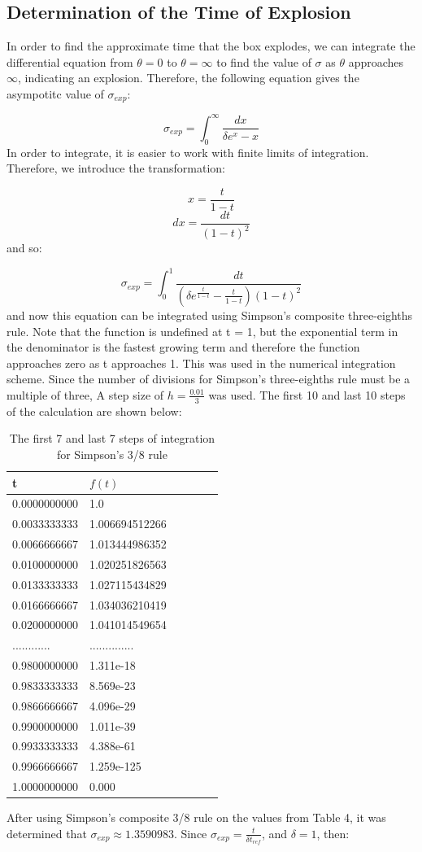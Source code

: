 \documentclass[12pt]{article}\pagestyle{myheadings}
\theoremstyle{plain}
\begin{document}
\subsection{Determination of the Time of Explosion}

In order to find the approximate time that the box explodes, we can integrate the differential equation from $\theta = 0$ to $\theta = \infty$ to find the value of $\sigma$ as $\theta$ approaches $\infty$, indicating an explosion. Therefore, the following equation gives the asympotitc value of $\sigma_{exp}$:

{\[\sigma_{exp} = \int_0^\infty \frac{dx}{\delta e^{x} - x} \]} In order to integrate, it is easier to work with finite limits of integration. Therefore, we introduce the transformation:

{\[x = \frac{t}{1-t}\]}
{\[dx = \frac{dt}{(1-t)^{2}}\]} and so:

{\[\sigma_{exp} = \int_0^1 \frac{dt}{(\delta e^{\frac{t}{1-t}} - \frac{t}{1-t})(1-t)^{2}} \]} and now this equation can be integrated using Simpson's composite three-eighths rule. Note that the function is undefined at t = 1, but the exponential term in the denominator is the fastest growing term and therefore the function approaches zero as t approaches 1. This was used in the numerical integration scheme. Since the number of divisions for Simpson's three-eighths rule must be a multiple of three, A step size of $h = \frac{0.01}{3}$ was used. The first 10 and last 10 steps of the calculation are shown below:

\begin{table}[ht!]
\centering
\begin{tabular} {| l | l | l | l | l | l |}
\hline
t & $f(t)$ \\
\hline
0.0000000000 & 1.0 \\
0.0033333333 & 1.006694512266 \\
0.0066666667 & 1.013444986352 \\
0.0100000000 & 1.020251826563 \\
0.0133333333 & 1.027115434829 \\
0.0166666667 & 1.034036210419 \\
0.0200000000 & 1.041014549654 \\
............ & .............. \\
0.9800000000 & 1.311e-18 \\
0.9833333333 & 8.569e-23 \\
0.9866666667 & 4.096e-29 \\
0.9900000000 & 1.011e-39 \\
0.9933333333 & 4.388e-61 \\
0.9966666667 & 1.259e-125 \\
1.0000000000 & 0.000 \\
\hline
\end{tabular}
\caption{The first 7 and last 7 steps of integration for Simpson's 3/8 rule}
\end{table} After using Simpson's composite 3/8 rule on the values from Table 4, it was determined that  $\sigma_{exp} \approx 1.3590983$. Since $\sigma_{exp} = \frac{t}{\delta t_{ref}}$, and $\delta = 1$, then:
\end{document}
